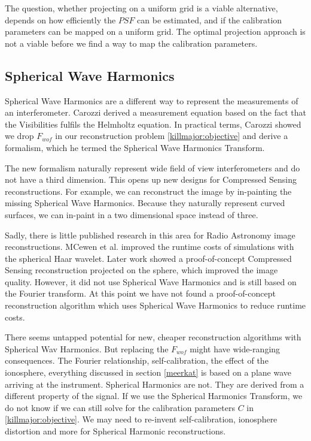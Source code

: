 The question, whether projecting on a uniform grid is a viable alternative, depends on how efficiently the $PSF$ can be estimated, and if the calibration parameters can be mapped on a uniform grid. The optimal projection approach is not a viable before we find a way to map the calibration parameters.


\subsection{Spherical Wave Harmonics}
Spherical Wave Harmonics are a different way to represent the measurements of an interferometer. Carozzi\cite{carozzi2015imaging} derived a measurement equation based on the fact that the Visibilities fulfils the Helmholtz equation. In practical terms, Carozzi showed we drop $F_{wof}$ in our reconstruction problem \eqref{killmajor:objective} and derive a formalism, which he termed the Spherical Wave Harmonics Transform. 

The new formalism naturally represent wide field of view interferometers and do not have a third dimension. This opens up new designs for Compressed Sensing reconstructions. For example, we can reconstruct the image by in-painting the missing Spherical Wave Harmonics. Because they naturally represent curved surfaces, we can in-paint in a two dimensional space instead of three.

Sadly, there is little published research in this area for Radio Astronomy image reconstructions. MCewen et al.\cite{mcewen2008simulating} improved the runtime costs of simulations with the spherical Haar wavelet. Later work\cite{mcewen2011compressed} showed a proof-of-concept Compressed Sensing reconstruction projected on the sphere, which improved the image quality. However, it did not use Spherical Wave Harmonics and \cite{mcewen2011compressed} is still based on the Fourier transform. At this point we have not found a proof-of-concept reconstruction algorithm which uses Spherical Wave Harmonics to reduce runtime costs. 

There seems untapped potential for new, cheaper reconstruction algorithms with Spherical Wav Harmonics. But replacing the $F_{wof}$ might have wide-ranging consequences. The Fourier relationship, self-calibration, the effect of the ionosphere, everything discussed in section \ref{meerkat} is based on a plane wave arriving at the instrument\cite{thompson1986interferometry, smirnov2011revisiting}. Spherical Harmonics are not. They are derived from a different property of the signal. If we use the Spherical Harmonics Transform, we do not know if we can still solve for the calibration parameters $C$ in \eqref{killmajor:objective}. We may need to re-invent self-calibration, ionosphere distortion and more for Spherical Harmonic reconstructions.


